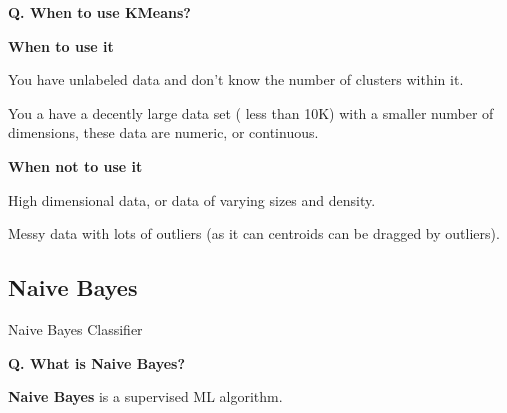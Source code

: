 \begin{frame}[fragile]{\textbf{Q. When to use KMeans?}}
  \vspace{.4em}
  \begin{wideitemize}
    \item \textbf{When to use it}
    \begin{wideitemize}
      \item You have unlabeled data and don't know the number of clusters within it.
      \item You a have a decently large data set ( less than 10K) with
      a smaller number of dimensions, these data are numeric, or continuous.
    \end{wideitemize}
    \item \textbf{When not to use it}
    \begin{wideitemize}
      \item High dimensional data, or data of varying sizes and density.
      \item Messy data with lots of outliers (as it can centroids can be dragged by outliers).
    \end{wideitemize}
  \end{wideitemize}
\end{frame}


\subsection{Naive Bayes}
\begin{transitionsubframe}
  \begin{center}
    \Huge Naive Bayes Classifier
  \end{center}
\end{transitionsubframe}


\begin{frame}[fragile]{\textbf{Q. What is Naive Bayes?}}
  \begin{wideitemize}
  \item \textbf{Naive Bayes} is a supervised ML algorithm.
  \end{wideitemize}
\end{frame}




